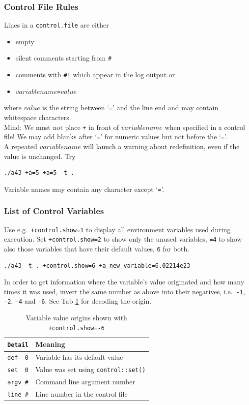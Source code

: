 \documentclass[oribibl]{llncs}
\newcommand{\ttt}[1]{\texttt{#1}}
\begin{document}
\subsubsection{Control File Rules} \label{sec:control-file-rules}
%
Lines in a \ttt{control.file} are either 
\begin{itemize}
    \item empty
    \item silent comments starting from \ttt{\#}
    \item comments with \ttt{\#!} which appear in the log output or
    \item $variablename$\ttt{=}$value$
\end{itemize}
where $value$ is the string between \lq{}\ttt{=}\rq{} and the line end and may contain whitespace characters.
\\
Mind: We must not place \ttt{+} in front of $variablename$ when specified in a control file!
We may add blanks after \lq{}\ttt{=}\rq{} for numeric values but not before the \lq{}\ttt{=}\rq{}.
\\
A repeated $variablename$ will launch a warning about redefinition, even if the value is unchanged. Try
\begin{verbatim}
./a43 +a=5 +a=5 -t .
\end{verbatim}
Variable names may contain any character except \lq\ttt{=}\rq.

\subsubsection{List of Control Variables} \label{sec:list-of-control-variables}
%
Use e.g.~\ttt{+control.show=1} to display all environment variables used during execution.
Set \ttt{+control.show=2} to show only the unused variables, \ttt{=4} to show also those variables that have their default values, \ttt{6} for both.
\begin{verbatim}
./a43 -t . +control.show=6 +a_new_variable=6.02214e23
\end{verbatim}
In order to get information where the variable's value originated and how many times it was used, invert the same number as above into their negatives, i.e.~\ttt{-1}, \ttt{-2}, \ttt{-4} and \ttt{-6}.
See Tab \ref{tab:control-show-details} for decoding the origin. 
%
%
\begin{table}[ht!]
\caption[Variable value origins]{
Variable value origins shown with \ttt{+control.show=-6}
} \label{tab:control-show-details}
\centering
\begin{tabular}{|l|l|}
\hline
  	 \ttt{Detail}    & Meaning   \\
\hline
     \verb+def  0+   & Variable has its default value      \\
     \verb+set  0+   & Value was set using \ttt{control::set()} \\
     \ttt{argv \#}   & Command line argument number \\
     \ttt{line \#}   & Line number in the control file \\
\hline
\end{tabular}
\end{table}
\end{document}
